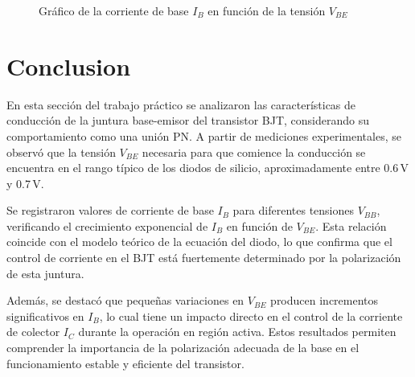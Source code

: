         \begin{figure}[h!]
            \centering
            \caption{Gráfico de la corriente de base $I_B$ en función de la tensión $V_{BE}$}
        \end{figure}
        
\newpage


    \section{Conclusion}


        En esta sección del trabajo práctico se analizaron las características de conducción de la juntura base-emisor del transistor BJT, considerando su comportamiento como una unión PN. A partir de mediciones experimentales, se observó que la tensión $V_{BE}$ necesaria para que comience la conducción se encuentra en el rango típico de los diodos de silicio, aproximadamente entre 0.6\,V y 0.7\,V.
        
        Se registraron valores de corriente de base $I_B$ para diferentes tensiones $V_{BB}$, verificando el crecimiento exponencial de $I_B$ en función de $V_{BE}$. Esta relación coincide con el modelo teórico de la ecuación del diodo, lo que confirma que el control de corriente en el BJT está fuertemente determinado por la polarización de esta juntura.
        
        Además, se destacó que pequeñas variaciones en $V_{BE}$ producen incrementos significativos en $I_B$, lo cual tiene un impacto directo en el control de la corriente de colector $I_C$ durante la operación en región activa. Estos resultados permiten comprender la importancia de la polarización adecuada de la base en el funcionamiento estable y eficiente del transistor.
